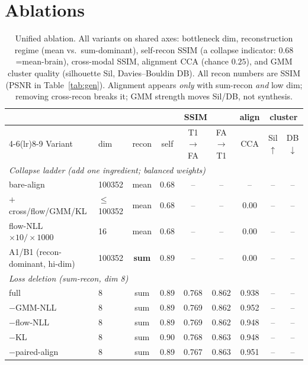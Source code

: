 \documentclass{article}
\begin{document}
\section{Ablations}
\label{sec:ablation}

\begin{table}[t]
  \centering
  \caption{Unified ablation. All variants on shared axes: bottleneck dim,
  reconstruction regime (mean vs.\ sum-dominant), self-recon SSIM (a collapse
  indicator: $0.68$=mean-brain), cross-modal SSIM, alignment CCA (chance $0.25$),
  and GMM cluster quality (silhouette Sil, Davies--Bouldin DB). All recon numbers
  are SSIM (PSNR in Table~\ref{tab:gen}). Alignment appears \emph{only} with
  sum-recon \emph{and} low dim; removing cross-recon breaks it; GMM strength moves
  Sil/DB, not synthesis.}
  \label{tab:abl}
  \small
  \begin{tabular}{llccccccc}
    \toprule
    & & & \multicolumn{3}{c}{SSIM} & align & \multicolumn{2}{c}{cluster} \\
    \cmidrule(lr){4-6}\cmidrule(lr){8-9}
    Variant & dim & recon & self & T1$\to$FA & FA$\to$T1 & CCA & Sil$\uparrow$ & DB$\downarrow$ \\
    \midrule
    \multicolumn{9}{l}{\emph{Collapse ladder (add one ingredient; balanced weights)}}\\
    bare-align                 & 100352 & mean & 0.68 & --    & --    & --   & --   & -- \\
    $+$cross/flow/GMM/KL       & $\le$100352 & mean & 0.68 & -- & -- & 0.00 & -- & -- \\
    flow-NLL $\times10/\times1000$ & 16 & mean & 0.68 & -- & -- & 0.00 & -- & -- \\
    A1/B1 (recon-dominant, hi-dim) & 100352 & \textbf{sum} & 0.89 & -- & -- & 0.00 & -- & -- \\
    \midrule
    \multicolumn{9}{l}{\emph{Loss deletion (sum-recon, dim 8)}}\\
    full                       & 8 & sum & 0.89 & 0.768 & 0.862 & 0.938 & -- & -- \\
    $-$GMM-NLL                 & 8 & sum & 0.89 & 0.769 & 0.862 & 0.952 & -- & -- \\
    $-$flow-NLL                & 8 & sum & 0.89 & 0.769 & 0.862 & 0.948 & -- & -- \\
    $-$KL                      & 8 & sum & 0.90 & 0.768 & 0.863 & 0.948 & -- & -- \\
    $-$paired-align            & 8 & sum & 0.89 & 0.767 & 0.863 & 0.951 & -- & -- \\

\end{tabular}
\end{table}
\end{document}
